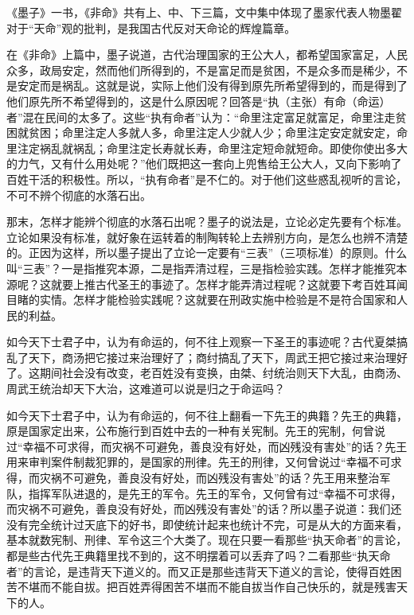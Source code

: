 \documentclass[a5paper,oneside,12pt]{ctexbook}
\begin{document}
{{《墨子》一书，《非命》共有上、中、下三篇，文中集中体现了墨家代表人物墨翟对于“天命”观的批判，是我国古代反对天命论的辉煌篇章。

在《非命》上篇中，墨子说道，古代治理国家的王公大人，都希望国家富足，人民众多，政局安定，然而他们所得到的，不是富足而是贫困，不是众多而是稀少，不是安定而是祸乱。这就是说，实际上他们没有得到原先所希望得到的，而是得到了他们原先所不希望得到的，这是什么原因呢？回答是“执（主张）有命（命运）者”混在民间的太多了。这些“执有命者”认为：“命里注定富足就富足，命里注走贫困就贫困；命里注定人多就人多，命里注定人少就人少；命里注定安定就安定，命里注定祸乱就祸乱；命里注定长寿就长寿，命里注定短命就短命。即使你使出多大的力气，又有什么用处呢？”他们既把这一套向上兜售给王公大人，又向下影响了百姓干活的积极性。所以，“执有命者”是不仁的。对于他们这些惑乱视听的言论，不可不辨个彻底的水落石出。

那末，怎样才能辨个彻底的水落石出呢？墨子的说法是，立论必定先要有个标准。立论如果没有标准，就好象在运转着的制陶转轮上去辨别方向，是怎么也辨不清楚的。正因为这样，所以墨子提出了立论一定要有“三表”（三项标准）的原则。什么叫“三表”？一是指推究本源，二是指弄清过程，三是指检验实践。怎样才能推究本源呢？这就要上推古代圣王的事迹了。怎样才能弄清过程呢？这就要下考百姓耳闻目睹的实情。怎样才能检验实践呢？这就要在刑政实施中检验是不是符合国家和人民的利益。

如今天下士君子中，认为有命运的，何不往上观察一下圣王的事迹呢？古代夏桀搞乱了天下，商汤把它接过来治理好了；商纣搞乱了天下，周武王把它接过来治理好了。这期间社会没有改变，老百姓没有变换，由桀、纣统治则天下大乱，由商汤、周武王统治却天下大治，这难道可以说是归之于命运吗？

如今天下士君子中，认为有命运的，何不往上翻看一下先王的典籍？先王的典籍，原是国家定出来，公布施行到百姓中去的一种有关宪制。先王的宪制，何曾说过“幸福不可求得，而灾祸不可避免，善良没有好处，而凶残没有害处”的话？先王用来审判案件制裁犯罪的，是国家的刑律。先王的刑律，又何曾说过“幸福不可求得，而灾祸不可避免，善良没有好处，而凶残没有害处”的话？先王用来整治军队，指挥军队进退的，是先王的军令。先王的军令，又何曾有过“幸福不可求得，而灾祸不可避免，善良没有好处，而凶残没有害处”的话？所以墨子说道：我们还没有完全统计过天底下的好书，即使统计起来也统计不完，可是从大的方面来看，基本就数宪制、刑律、军令这三个大类了。现在只要一看那些“执天命者”的言论，都是些古代先王典籍里找不到的，这不明摆着可以丢弃了吗？二看那些“执天命者”的言论，是违背天下道义的。而又正是那些违背天下道义的言论，使得百姓困苦不堪而不能自拔。把百姓弄得困苦不堪而不能自拔当作自己快乐的，就是残害天下的人。

}}
\end{document}
